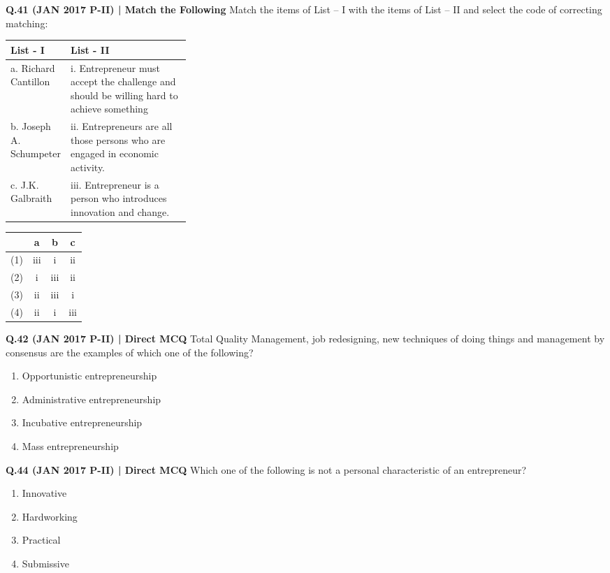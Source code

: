 \documentclass{article}
\begin{document}
\textbf{Q.41 (JAN 2017 P-II) | Match the Following}
Match the items of List – I with the items of List – II and select the code of correcting matching:
\begin{tabularx}{\linewidth}{@{} p{0.3\linewidth} X @{}}
    \toprule
    \textbf{List - I} & \textbf{List - II} \\
    \midrule
    a. Richard Cantillon         & i. Entrepreneur must accept the challenge and should be willing hard to achieve something \\
    b. Joseph A. Schumpeter      & ii. Entrepreneurs are all those persons who are engaged in economic activity. \\
    c. J.K. Galbraith            & iii. Entrepreneur is a person who introduces innovation and change. \\
    \bottomrule
\end{tabularx}
\begin{tabularx}{\linewidth}{@{} l *{3}{c} @{}}
    \toprule
    & a    & b    & c \\
    \midrule
    (1)  & iii  & i    & ii \\
    (2)  & i    & iii  & ii \\
    (3)  & ii   & iii  & i \\
    (4)  & ii   & i    & iii \\
    \bottomrule
\end{tabularx}

\textbf{Q.42 (JAN 2017 P-II) | Direct MCQ}
Total Quality Management, job redesigning, new techniques of doing things and management by consensus are the examples of which one of the following?
\begin{enumerate}[label=(\arabic*)]
    \item Opportunistic entrepreneurship
    \item Administrative entrepreneurship
    \item Incubative entrepreneurship
    \item Mass entrepreneurship
\end{enumerate}

\textbf{Q.44 (JAN 2017 P-II) | Direct MCQ}
Which one of the following is not a personal characteristic of an entrepreneur?
\begin{enumerate}[label=(\arabic*)]
    \item Innovative
    \item Hardworking
    \item Practical
    \item Submissive
\end{enumerate}
\end{document}
